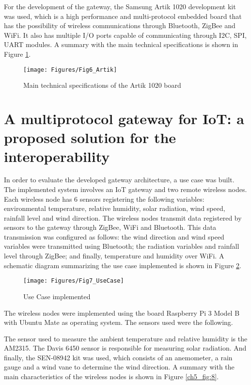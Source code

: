 For the development of the gateway, the Samsung Artik 1020 development kit was used, which is a high performance and multi-protocol embedded board that has the possibility of wireless communications through Bluetooth, ZigBee and WiFi. It also has multiple I/O ports capable of communicating through I2C, SPI, UART modules. A summary with the main technical specifications is shown in Figure \ref{ch5_fig:6}.

\begin{figure}[ht!]
\centering
\texttt{[image: Figures/Fig6\_Artik]}
\caption{Main technical specifications of the Artik 1020 board}
\label{ch5_fig:6}       %
\end{figure}

\section{A multiprotocol gateway for IoT: a proposed solution for the interoperability}
\label{sec:5.5}

In order to evaluate the developed gateway architecture, a use case was built. The implemented system involves an IoT gateway and two remote wireless nodes. Each wireless node has 6 sensors registering the following variables: environmental temperature, relative humidity, solar radiation, wind speed, rainfall level and wind direction. The wireless nodes transmit data registered by sensors to the gateway through ZigBee, WiFi and Bluetooth. This data transmission was configured as follows: the wind direction and wind speed variables were transmitted using Bluetooth; the radiation variables and rainfall level through ZigBee; and finally, temperature and humidity over WiFi. A schematic diagram summarizing the use case implemented is shown in Figure \ref{ch5_fig:7}.

\begin{figure}[ht!]
\centering
\texttt{[image: Figures/Fig7\_UseCase]}
\caption{Use Case implemented}
\label{ch5_fig:7}       %
\end{figure}

The wireless nodes were implemented using the board Raspberry Pi 3 Model B with Ubuntu Mate as operating system. The sensors used were the following.

The sensor used to measure the ambient temperature and relative humidity is the AM2315. The Davis 6450 sensor is responsible for measuring solar radiation. And finally, the SEN-08942 kit was used, which consists of an anemometer, a rain gauge and a wind vane to determine the wind direction. A summary with the main characteristics of the wireless nodes is shown in Figure \ref{ch5_fig:8}.

